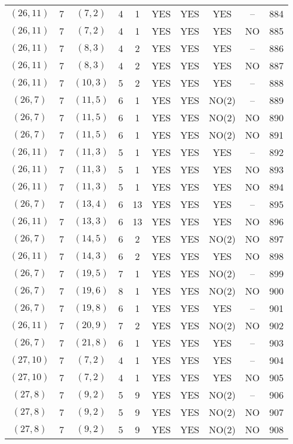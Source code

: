 \begin{longtable}{|c|c|c|c|c|c|c|c|c|c|}
$(26, 11)$ & 7 & $(7, 2)$ & 4 & 1 & YES & YES & YES & -- & 884\\
$(26, 11)$ & 7 & $(7, 2)$ & 4 & 1 & YES & YES & YES & NO & 885\\
$(26, 11)$ & 7 & $(8, 3)$ & 4 & 2 & YES & YES & YES & -- & 886\\
$(26, 11)$ & 7 & $(8, 3)$ & 4 & 2 & YES & YES & YES & NO & 887\\
$(26, 11)$ & 7 & $(10, 3)$ & 5 & 2 & YES & YES & YES & -- & 888\\
$(26, 7)$ & 7 & $(11, 5)$ & 6 & 1 & YES & YES & NO(2) & -- & 889\\
$(26, 7)$ & 7 & $(11, 5)$ & 6 & 1 & YES & YES & NO(2) & NO & 890\\
$(26, 7)$ & 7 & $(11, 5)$ & 6 & 1 & YES & YES & NO(2) & NO & 891\\
$(26, 11)$ & 7 & $(11, 3)$ & 5 & 1 & YES & YES & YES & -- & 892\\
$(26, 11)$ & 7 & $(11, 3)$ & 5 & 1 & YES & YES & YES & NO & 893\\
$(26, 11)$ & 7 & $(11, 3)$ & 5 & 1 & YES & YES & YES & NO & 894\\
$(26, 7)$ & 7 & $(13, 4)$ & 6 & 13 & YES & YES & YES & -- & 895\\
$(26, 11)$ & 7 & $(13, 3)$ & 6 & 13 & YES & YES & YES & NO & 896\\
$(26, 7)$ & 7 & $(14, 5)$ & 6 & 2 & YES & YES & NO(2) & NO & 897\\
$(26, 11)$ & 7 & $(14, 3)$ & 6 & 2 & YES & YES & YES & NO & 898\\
$(26, 7)$ & 7 & $(19, 5)$ & 7 & 1 & YES & YES & NO(2) & -- & 899\\
$(26, 7)$ & 7 & $(19, 6)$ & 8 & 1 & YES & YES & NO(2) & NO & 900\\
$(26, 7)$ & 7 & $(19, 8)$ & 6 & 1 & YES & YES & YES & -- & 901\\
$(26, 11)$ & 7 & $(20, 9)$ & 7 & 2 & YES & YES & NO(2) & NO & 902\\
$(26, 7)$ & 7 & $(21, 8)$ & 6 & 1 & YES & YES & YES & -- & 903\\
$(27, 10)$ & 7 & $(7, 2)$ & 4 & 1 & YES & YES & YES & -- & 904\\
$(27, 10)$ & 7 & $(7, 2)$ & 4 & 1 & YES & YES & YES & NO & 905\\
$(27, 8)$ & 7 & $(9, 2)$ & 5 & 9 & YES & YES & NO(2) & -- & 906\\
$(27, 8)$ & 7 & $(9, 2)$ & 5 & 9 & YES & YES & NO(2) & NO & 907\\
$(27, 8)$ & 7 & $(9, 2)$ & 5 & 9 & YES & YES & NO(2) & NO & 908\\

\end{longtable}
